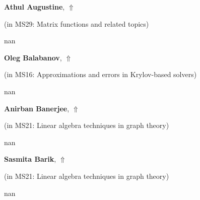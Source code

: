 \documentclass[ILAS2025-program.tex]{subfiles}
\begin{document}
     \hypertarget{down0159}{}\begin{ilasabstract}
    
    \textbf{Athul Augustine},  \hfill \hyperlink{up0159}{$\Uparrow$}
    
    (in {\color{mstitle}MS29: Matrix functions and related topics})
        
        \mtskip
    nan\end{ilasabstract}
     \hypertarget{down0344}{}\begin{ilasabstract}
    
    \textbf{Oleg Balabanov},  \hfill \hyperlink{up0344}{$\Uparrow$}
    
    (in {\color{mstitle}MS16: Approximations and errors in Krylov-based solvers})
        
        \mtskip
    nan\end{ilasabstract}
     \hypertarget{down0381}{}\begin{ilasabstract}
    
    \textbf{Anirban Banerjee},  \hfill \hyperlink{up0381}{$\Uparrow$}
    
    (in {\color{mstitle}MS21: Linear algebra techniques in graph theory})
        
        \mtskip
    nan\end{ilasabstract}
     \hypertarget{down0336}{}\begin{ilasabstract}
    
    \textbf{Sasmita Barik},  \hfill \hyperlink{up0336}{$\Uparrow$}
    
    (in {\color{mstitle}MS21: Linear algebra techniques in graph theory})
        
        \mtskip
    nan\end{ilasabstract}
\end{document}
